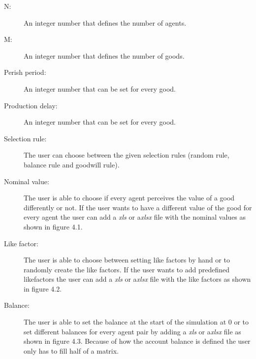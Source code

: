\documentclass[twoside,openright]{uva-bachelor-thesis}
\begin{document}
\begin{description}
  \item[N:] An integer number that defines the number of agents.
  \item[M:] An integer number that defines the number of goods.
  \item[Perish period:] An integer number that can be set for every good.
  \item[Production delay:] An integer number that can be set for every good.
 \item[Selection rule:] The user can choose between the given selection rules (random rule, balance rule and goodwill rule). 
  \item[Nominal value:] The user is able to choose if every agent perceives the value of a good differently or not. If the user wants to have a different value of the good for every agent the user can add a \textit{xls} or a\textit{xlsx} file with the nominal values as shown in figure 4.1.
  \item[Like factor:] The user is able to choose between setting like factors by hand or to randomly create the like factors. If the user wants to add predefined likefactors the user can add a \textit{xls} or a\textit{xlsx} file with the like factors as shown in figure 4.2.
 \item[Balance:] The user is able to set the balance at the start of the simulation at 0 or to set different balances for every agent pair by adding a  \textit{xls} or a\textit{xlsx} file as shown in figure 4.3. Because of how the account balance is defined the user only has to fill half of a matrix.
\end{description}
\end{document}
